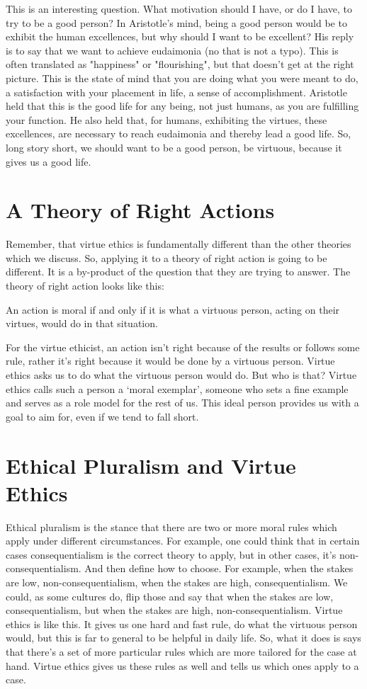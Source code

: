 This is an interesting question. What motivation should I have, or do I have, to try to be a good person? In Aristotle's mind, being a good person would be to exhibit the human excellences, but why should I want to be excellent? His reply is to say that we want to achieve eudaimonia (no that is not a typo). This is often translated as "happiness" or "flourishing", but that doesn't get at the right picture. This is the state of mind that you are doing what you were meant to do, a satisfaction with your placement in life, a sense of accomplishment. Aristotle held that this is the good life for any being, not just humans, as you are fulfilling your function. He also held that, for humans, exhibiting the virtues, these excellences, are necessary to reach eudaimonia and thereby lead a good life. So, long story short, we should want to be a good person, be virtuous, because it gives us a good life. 

\section{A Theory of Right Actions}

Remember, that virtue ethics is fundamentally different than the other theories which we discuss. So, applying it to a theory of right action is going to be different. It is a by-product of the question that they are trying to answer. The theory of right action looks like this:
\begin{center}
An action is moral if and only if it is what a virtuous person, acting on their virtues, would do in that situation.
\end{center}
For the virtue ethicist, an action isn’t right because of the results or follows some rule, rather it’s right because it would be done by a virtuous person. Virtue ethics asks us to do what the virtuous person would do. But who is that? Virtue ethics calls such a person a ‘moral exemplar’, someone who sets a fine example and serves as a role model for the rest of us. This ideal person provides us with a goal to aim for, even if we tend to fall short.
\section{Ethical Pluralism and Virtue Ethics}

Ethical pluralism is the stance that there are two or more moral rules which apply under different circumstances. For example, one could think that in certain cases consequentialism is the correct theory to apply, but in other cases, it’s non-consequentialism. And then define how to choose. For example, when the stakes are low, non-consequentialism, when the stakes are high, consequentialism. We could, as some cultures do, flip those and say that when the stakes are low, consequentialism, but when the stakes are high, non-consequentialism. Virtue ethics is like this. It gives us one hard and fast rule, do what the virtuous person would, but this is far to general to be helpful in daily life. So, what it does is says that there’s a set of more particular rules which are more tailored for the case at hand. Virtue ethics gives us these rules as well and tells us which ones apply to a case.

